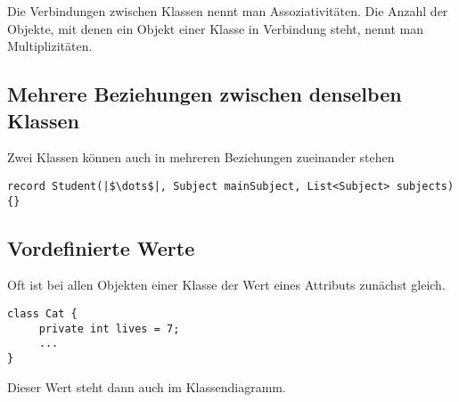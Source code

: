 \documentclass[a4paper]{scrartcl}
\begin{document}
Die Verbindungen zwischen Klassen nennt man Assoziativitäten. Die Anzahl der Objekte, mit denen ein Objekt einer Klasse in Verbindung steht, nennt man Multiplizitäten.

\subsection*{Mehrere Beziehungen zwischen denselben Klassen}
Zwei Klassen können auch in mehreren Beziehungen zueinander stehen
\begin{verbatim}
record Student(|$\dots$|, Subject mainSubject, List<Subject> subjects){}
\end{verbatim}


\begin{center}
\end{center}


\subsection*{Vordefinierte Werte}

Oft ist bei allen Objekten einer Klasse der Wert eines Attributs zunächst gleich.

\begin{verbatim}
class Cat {
     private int lives = 7;
     ...
}
\end{verbatim}

Dieser Wert steht dann auch im Klassendiagramm.


\begin{center}
\end{center}
\end{document}
